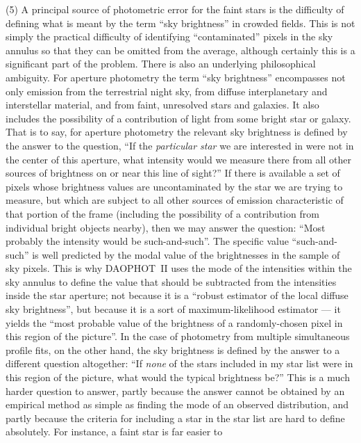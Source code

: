 \item{(5)} A principal source of photometric error for the faint stars
is the difficulty of defining what is meant by the term ``sky
brightness'' in crowded fields.  This is not simply the practical
difficulty of identifying ``contaminated'' pixels in the sky annulus so
that they can be omitted from the average, although certainly this is a
significant part of the problem.  There is also an underlying
philosophical ambiguity. For aperture photometry the term ``sky
brightness'' encompasses not only emission from the terrestrial night
sky, from diffuse interplanetary and interstellar material, and from
faint, unresolved stars and galaxies. It also includes the possibility
of a contribution of light from some bright star or galaxy.  That is to
say, for aperture photometry the relevant sky brightness is defined by
the answer to the question, ``If the {\it particular star\/} we are
interested in were not in the center of this aperture, what intensity
would we measure there from all other sources of brightness on or near
this line of sight?'' If there is available a set of pixels whose
brightness values are uncontaminated by the star we are trying to
measure, but which are subject to all other sources of emission
characteristic of that portion of the frame (including the possibility
of a contribution from individual bright objects nearby), then we may
answer the question: ``Most probably the intensity would be
such-and-such''.  The specific value ``such-and-such'' is well
predicted by the modal value of the brightnesses in the sample of sky
pixels. This is why DAOPHOT~II uses the mode of the intensities within
the sky annulus to define the value that should be subtracted from the
intensities inside the star aperture; not because it is a ``robust
estimator of the local diffuse sky brightness'', but because it is a
sort of maximum-likelihood estimator --- it yields the ``most probable
value of the brightness of a randomly-chosen pixel in this region of
the picture''. In the case of photometry from multiple simultaneous
profile fits, on the other hand, the sky brightness is defined by the
answer to a different question altogether:  ``If {\it none} of the
stars included in my star list were in this region of the picture, what
would the typical brightness be?'' This is a much harder question to
answer, partly because the answer cannot be obtained by an empirical
method as simple as finding the mode of an observed distribution, and
partly because the criteria for including a star in the star list are
hard to define absolutely.  For instance, a faint star is far easier to
